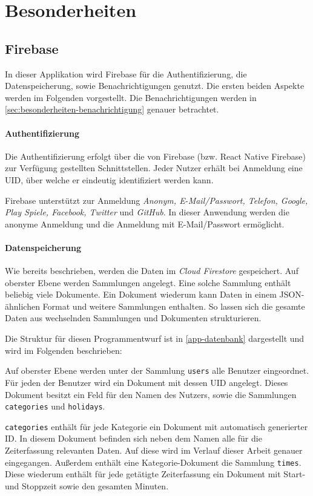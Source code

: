 \section{Besonderheiten}
\subsection{Firebase}
In dieser Applikation wird Firebase für die Authentifizierung,
die Datenspeicherung, sowie Benachrichtigungen genutzt.
Die ersten beiden Aspekte werden im Folgenden vorgestellt.
Die Benachrichtigungen werden in \autoref{sec:besonderheiten-benachrichtigung} genauer betrachtet.

\paragraph{Authentifizierung}
Die Authentifizierung erfolgt über die von Firebase (bzw. React Native Firebase) zur Verfügung gestellten Schnittstellen.
Jeder Nutzer erhält bei Anmeldung eine UID, über welche er eindeutig identifiziert werden kann.

Firebase unterstützt zur Anmeldung \emph{Anonym, E-Mail/Passwort, Telefon, Google, Play Spiele, Facebook, Twitter} und \emph{GitHub}.
In dieser Anwendung werden die anonyme Anmeldung und die Anmeldung mit E-Mail/Passwort ermöglicht.

\paragraph{Datenspeicherung}
Wie bereits beschrieben, werden die Daten im \textit{Cloud Firestore} gespeichert.
Auf oberster Ebene werden Sammlungen angelegt.
Eine solche Sammlung enthält beliebig viele Dokumente.
Ein Dokument wiederum kann Daten in einem JSON-ähnlichen Format und weitere Sammlungen enthalten.
So lassen sich die gesamte Daten aus wechselnden Sammlungen und Dokumenten strukturieren.

Die Struktur für diesen Programmentwurf ist in \autoref{app-datenbank} dargestellt und wird im Folgenden beschrieben:

Auf oberster Ebene werden unter der Sammlung \texttt{users} alle Benutzer eingeordnet.
Für jeden der Benutzer wird ein Dokument mit dessen UID angelegt.
Dieses Dokument besitzt ein Feld für den Namen des Nutzers,
sowie die Sammlungen \texttt{categories} und \texttt{holidays}.

\texttt{categories} enthält für jede Kategorie ein Dokument mit automatisch generierter ID.
In diesem Dokument befinden sich neben dem Namen alle für die Zeiterfassung relevanten Daten.
Auf diese wird im Verlauf dieser Arbeit genauer eingegangen.
Außerdem enthält eine Kategorie-Dokument die Sammlung \texttt{times}.
Diese wiederum enthält für jede getätigte Zeiterfassung ein Dokument mit Start- und Stoppzeit sowie den gesamten Minuten.

